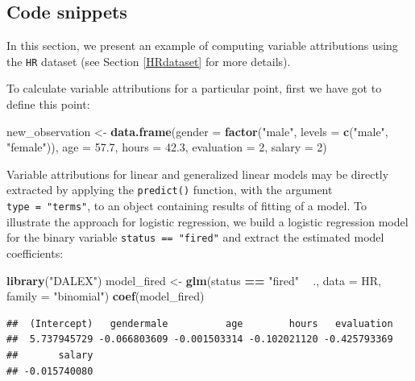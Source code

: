 \documentclass[12pt,]{krantz}
\newenvironment{Shaded}{\begin{snugshade}}{\end{snugshade}}
\newcommand{\DataTypeTok}[1]{\textcolor[rgb]{0.13,0.29,0.53}{#1}}
\newcommand{\DecValTok}[1]{\textcolor[rgb]{0.00,0.00,0.81}{#1}}
\newcommand{\FloatTok}[1]{\textcolor[rgb]{0.00,0.00,0.81}{#1}}
\newcommand{\KeywordTok}[1]{\textcolor[rgb]{0.13,0.29,0.53}{\textbf{#1}}}
\newcommand{\NormalTok}[1]{#1}
\newcommand{\OperatorTok}[1]{\textcolor[rgb]{0.81,0.36,0.00}{\textbf{#1}}}
\newcommand{\StringTok}[1]{\textcolor[rgb]{0.31,0.60,0.02}{#1}}
\theoremstyle{definition}
\theoremstyle{definition}
\theoremstyle{definition}
\theoremstyle{remark}
\begin{document}
\hypertarget{code-snippets-1}{%
\subsection{Code snippets}\label{code-snippets-1}}

In this section, we present an example of computing variable
attributions using the \texttt{HR} dataset (see Section \ref{HRdataset}
for more details).

To calculate variable attributions for a particular point, first we have
got to define this point:

\begin{Shaded}
\begin{Highlighting}[]
\NormalTok{new_observation <-}\StringTok{ }\KeywordTok{data.frame}\NormalTok{(}\DataTypeTok{gender =} \KeywordTok{factor}\NormalTok{(}\StringTok{"male"}\NormalTok{, }\DataTypeTok{levels =} \KeywordTok{c}\NormalTok{(}\StringTok{"male"}\NormalTok{, }\StringTok{"female"}\NormalTok{)),}
                      \DataTypeTok{age =} \FloatTok{57.7}\NormalTok{,}
                      \DataTypeTok{hours =} \FloatTok{42.3}\NormalTok{,}
                      \DataTypeTok{evaluation =} \DecValTok{2}\NormalTok{,}
                      \DataTypeTok{salary =} \DecValTok{2}\NormalTok{)}
\end{Highlighting}
\end{Shaded}

Variable attributions for linear and generalized linear models may be
directly extracted by applying the \texttt{predict()} function, with the
argument \texttt{type\ =\ "terms"}, to an object containing results of
fitting of a model. To illustrate the approach for logistic regression,
we build a logistic regression model for the binary variable
\texttt{status\ ==\ "fired"} and extract the estimated model
coefficients:

\begin{Shaded}
\begin{Highlighting}[]
\KeywordTok{library}\NormalTok{(}\StringTok{"DALEX"}\NormalTok{)}
\NormalTok{model_fired <-}\StringTok{ }\KeywordTok{glm}\NormalTok{(status }\OperatorTok{==}\StringTok{ "fired"} \OperatorTok{~}\StringTok{ }\NormalTok{., }\DataTypeTok{data =}\NormalTok{ HR, }\DataTypeTok{family =} \StringTok{"binomial"}\NormalTok{)}
\KeywordTok{coef}\NormalTok{(model_fired)}
\end{Highlighting}
\end{Shaded}

\begin{verbatim}
##  (Intercept)   gendermale          age        hours   evaluation 
##  5.737945729 -0.066803609 -0.001503314 -0.102021120 -0.425793369 
##       salary 
## -0.015740080
\end{verbatim}
\end{document}
